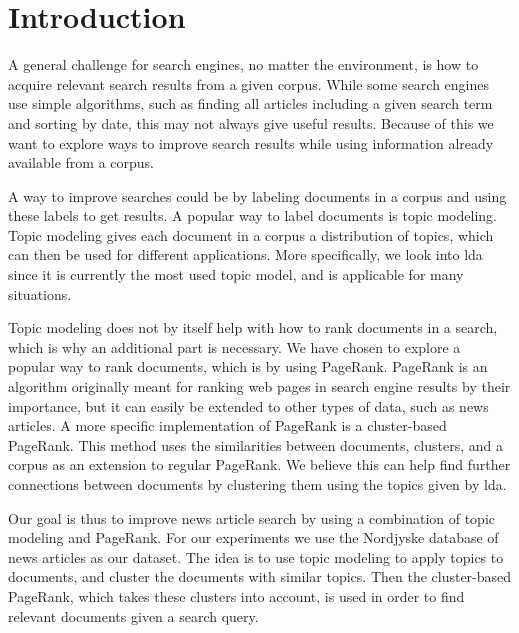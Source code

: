 \section{Introduction}
A general challenge for search engines, no matter the environment, is how to acquire relevant search results from a given corpus.
While some search engines use simple algorithms, such as finding all articles including a given search term and sorting by date, this may not always give useful results.
Because of this we want to explore ways to improve search results while using information already available from a corpus.

A way to improve searches could be by labeling documents in a corpus and using these labels to get results.
A popular way to label documents is topic modeling.
Topic modeling gives each document in a corpus a distribution of topics, which can then be used for different applications.
More specifically, we look into \gls{lda} since it is currently the most used topic model, and is applicable for many situations\cite{lda}.

Topic modeling does not by itself help with how to rank documents in a search, which is why an additional part is necessary.
We have chosen to explore a popular way to rank documents, which is by using PageRank.
PageRank is an algorithm originally meant for ranking web pages in search engine results by their importance, but it can easily be extended to other types of data, such as news articles.
A more specific implementation of PageRank is a cluster-based PageRank\cite{ClusterPageRank}.
This method uses the similarities between documents, clusters, and a corpus as an extension to regular PageRank.
We believe this can help find further connections between documents by clustering them using the topics given by \gls{lda}.

Our goal is thus to improve news article search by using a combination of topic modeling and PageRank.
For our experiments we use the Nordjyske database of news articles as our dataset.
The idea is to use topic modeling to apply topics to documents, and cluster the documents with similar topics.
Then the cluster-based PageRank, which takes these clusters into account, is used in order to find relevant documents given a search query.




